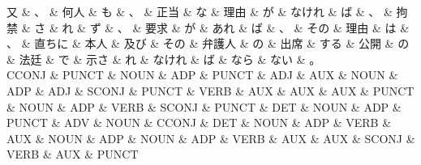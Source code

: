 \documentclass[tikz,border=5pt]{standalone}
\begin{document}
\small
\begin{dependency}[edge unit distance=6.6pt]
    \begin{deptext}[column sep=0.5em]
        又 \& 、 \& 何人 \& も \& 、 \& 正当 \& な \& 理由 \& が \& なけれ \& ば \& 、 \& 拘禁 \& さ \& れ \& ず \& 、 \& 要求 \& が \& あれ \& ば \& 、 \& その \& 理由 \& は \& 、 \& 直ちに \& 本人 \& 及び \& その \& 弁護人 \& の \& 出席 \& する \& 公開 \& の \& 法廷 \& で \& 示さ \& れ \& なけれ \& ば \& なら \& ない \& 。\\
        CCONJ \& PUNCT \& NOUN \& ADP \& PUNCT \& ADJ \& AUX \& NOUN \& ADP \& ADJ \& SCONJ \& PUNCT \& VERB \& AUX \& AUX \& AUX \& PUNCT \& NOUN \& ADP \& VERB \& SCONJ \& PUNCT \& DET \& NOUN \& ADP \& PUNCT \& ADV \& NOUN \& CCONJ \& DET \& NOUN \& ADP \& VERB \& AUX \& NOUN \& ADP \& NOUN \& ADP \& VERB \& AUX \& AUX \& SCONJ \& VERB \& AUX \& PUNCT\\
    \end{deptext}
\end{dependency}
\end{document}
